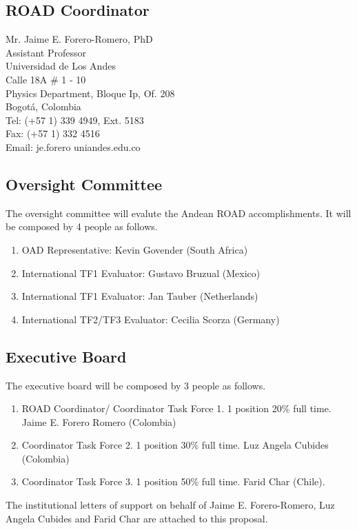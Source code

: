 \documentclass[12pt]{article}
\begin{document}
\subsection*{ROAD Coordinator}
\noindent
Mr. Jaime E. Forero-Romero, PhD\\
Assistant Professor\\
Universidad de Los Andes\\
Calle 18A \# 1 - 10\\
Physics Department, Bloque Ip, Of. 208\\
Bogot\'a, Colombia\\
Tel:  (+57 1) 339 4949, Ext. 5183\\
Fax: (+57 1) 332 4516 \\
Email: je.forero uniandes.edu.co\\

\subsection*{Oversight Committee}

The oversight committee will evalute the Andean ROAD
accomplishments. It will be composed by 4 people as follows.
\begin{enumerate}
\item OAD Representative: Kevin Govender (South Africa)
\item International TF1 Evaluator: Gustavo Bruzual (Mexico)
\item International TF1 Evaluator: Jan Tauber (Netherlands)
\item International TF2/TF3 Evaluator: Cecilia Scorza (Germany)
\end{enumerate}
\subsection*{Executive Board}
\noindent
The executive board will be composed by 3 people as follows.
\begin{enumerate}
\item ROAD Coordinator/ Coordinator Task Force 1. 1 position 20\% full
  time. Jaime E. Forero Romero (Colombia) 
\item Coordinator Task Force 2. 1 position 30\% full time. Luz Angela
  Cubides (Colombia) 
\item Coordinator Task Force 3. 1 position 50\% full time. Farid Char
  (Chile). 
\end{enumerate}

\noindent
The institutional letters of support on behalf of Jaime
E. Forero-Romero, Luz Angela Cubides and Farid Char are attached to this
proposal. 
\end{document}
